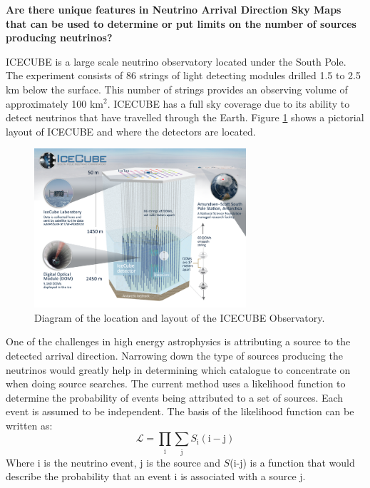 \documentclass[a4paper,12pt,twoside,openright]{article}
\begin{document}
\begin{center}
\large \textbf{Are there unique features in Neutrino Arrival Direction Sky Maps that can be used to determine or put limits on the number of sources producing neutrinos?}
\end{center}

\normalsize
ICECUBE is a large scale neutrino observatory located under the South Pole. The experiment consists of 86 strings of light detecting modules drilled 1.5 to 2.5 km below the surface. This number of strings provides an observing volume of approximately 100 km$^2$. ICECUBE has a full sky coverage due to its ability to detect neutrinos that have travelled through the Earth. Figure \ref{fig:ICECUBE} shows a pictorial layout of ICECUBE and where the detectors are located.

\begin{figure}[h]
\centering
\includegraphics[width=0.7\textwidth]{icecube_detector_sm.png}
\caption{Diagram of the location and layout of the ICECUBE Observatory.}
\label{fig:ICECUBE}
\end{figure}


One of the challenges in high energy astrophysics is attributing a source to the detected arrival direction. Narrowing down the type of sources producing the neutrinos would greatly help in determining which catalogue to concentrate on when doing source searches. The current method uses a likelihood function to determine the probability of events being attributed to a set of sources. Each event is assumed to be independent. The basis of the likelihood function can be written as:
\begin{equation}
\mathcal{L} = \prod_{\mathrm{i}} \sum_{\mathrm{j}} S_{\mathrm{i}}(\mathrm{i} - \mathrm{j})
\end{equation}
Where i is the neutrino event, j is the source and $S$(i-j) is a function that would describe the probability that an event i is associated with a source j.
\end{document}

